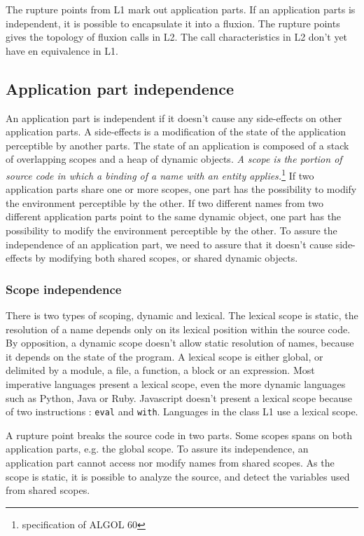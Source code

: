 The rupture points from L1 mark out application parts.
If an application parts is independent, it is possible to encapsulate it into a fluxion.
The rupture points gives the topology of fluxion calls in L2.
The call characteristics in L2 don't yet have en equivalence in L1.

\subsection{Application part independence}

An application part is independent if it doesn't cause any side-effects on other application parts.
A side-effects is a modification of the state of the application perceptible by another parts.
The state of an application is composed of a stack of overlapping scopes and a heap of dynamic objects.
\textit{A scope is the portion of source code in which a binding of a name with an entity applies.}\footnote{specification of ALGOL 60}
If two application parts share one or more scopes, one part has the possibility to modify the environment perceptible by the other.
If two different names from two different application parts point to the same dynamic object, one part has the possibility to modify the environment perceptible by the other.
To assure the independence of an application part, we need to assure that it doesn't cause side-effects by modifying both shared scopes, or shared dynamic objects.

\subsubsection{Scope independence}

There is two types of scoping, dynamic and lexical.
The lexical scope is static, the resolution of a name depends only on its lexical position within the source code.
By opposition, a dynamic scope doesn't allow static resolution of names, because it depends on the state of the program.
A lexical scope is either global, or delimited by a module, a file, a function, a block or an expression.
Most imperative languages present a lexical scope, even the more dynamic languages such as Python, Java or Ruby.
Javascript doesn't present a lexical scope because of two instructions : \texttt{eval} and \texttt{with}.
Languages in the class L1 use a lexical scope.

A rupture point breaks the source code in two parts.
Some scopes spans on both application parts, e.g. the global scope.
To assure its independence, an application part cannot access nor modify names from shared scopes.
As the scope is static, it is possible to analyze the source, and detect the variables used from shared scopes.

